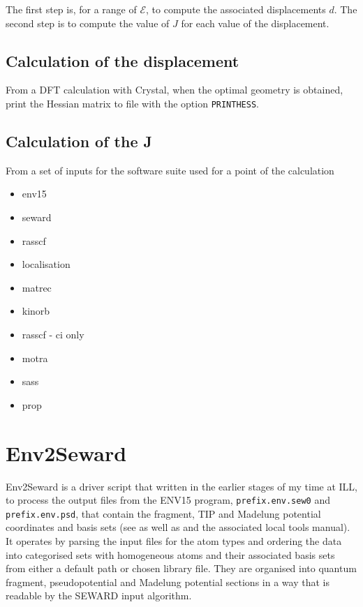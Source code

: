 \documentclass[10pt]{article}
\begin{document}
The first step is, for a range of $\mathcal{E}$, to compute the associated displacements $d$. The second step is to compute the value of $J$ for each value of the displacement.


\subsection{Calculation of the displacement}
From a DFT calculation with Crystal, when the optimal geometry is obtained, print the Hessian matrix to file with the option \verb|PRINTHESS|. 


\subsection{Calculation of the J}

From a set of inputs for the software suite used for a point of the calculation
\begin{itemize}
	\item env15
	\item seward
	\item rasscf
	\item localisation
	\item matrec
	\item kinorb
	\item rasscf - ci only
	\item motra
	\item sass
	\item prop
\end{itemize}

\section{Env2Seward}
Env2Seward is a driver script that written in the earlier stages of my time at ILL, to process the output files from the ENV15 program, \texttt{prefix.env.sew0} and \texttt{prefix.env.psd}, that contain the fragment, TIP and Madelung potential coordinates and basis sets (see \cite{varignon2013ab} as well as \cite{gelle2008fast} and the associated local tools manual). It operates by parsing the input files for the atom types and ordering the data into categorised sets with homogeneous atoms and their associated basis sets from either a default path or chosen library file. They are organised into quantum fragment, pseudopotential and Madelung potential sections in a way that is readable by the SEWARD input algorithm.



\end{document}
